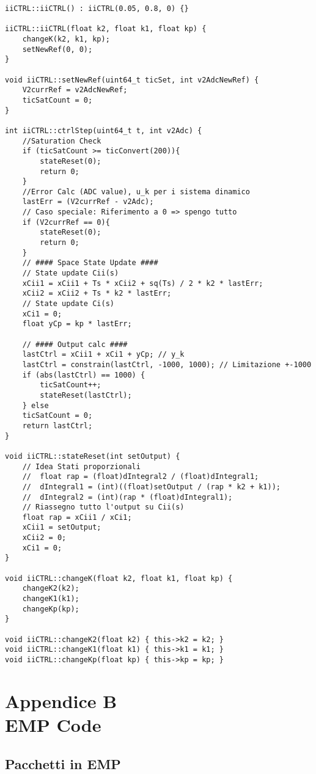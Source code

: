\begin{lstlisting}[style=cppStyle,caption={Source Classe controllore C(s)},label=lst:controlClassCpp] 
iiCTRL::iiCTRL() : iiCTRL(0.05, 0.8, 0) {}

iiCTRL::iiCTRL(float k2, float k1, float kp) {
	changeK(k2, k1, kp);
	setNewRef(0, 0);
}

void iiCTRL::setNewRef(uint64_t ticSet, int v2AdcNewRef) {
	V2currRef = v2AdcNewRef;
	ticSatCount = 0;
}

int iiCTRL::ctrlStep(uint64_t t, int v2Adc) {
	//Saturation Check
	if (ticSatCount >= ticConvert(200)){
		stateReset(0);
		return 0;
	}
	//Error Calc (ADC value), u_k per i sistema dinamico
	lastErr = (V2currRef - v2Adc);
	// Caso speciale: Riferimento a 0 => spengo tutto
	if (V2currRef == 0){
		stateReset(0);
		return 0;
	}
	// #### Space State Update ####
	// State update Cii(s)
	xCii1 = xCii1 + Ts * xCii2 + sq(Ts) / 2 * k2 * lastErr;
	xCii2 = xCii2 + Ts * k2 * lastErr;
	// State update Ci(s)
	xCi1 = 0;
	float yCp = kp * lastErr;
	
	// #### Output calc ####
	lastCtrl = xCii1 + xCi1 + yCp; // y_k
	lastCtrl = constrain(lastCtrl, -1000, 1000); // Limitazione +-1000
	if (abs(lastCtrl) == 1000) {
		ticSatCount++;
		stateReset(lastCtrl);
	} else
	ticSatCount = 0;
	return lastCtrl;
}

void iiCTRL::stateReset(int setOutput) {
	// Idea Stati proporzionali
	//  float rap = (float)dIntegral2 / (float)dIntegral1;
	//  dIntegral1 = (int)((float)setOutput / (rap * k2 + k1));
	//  dIntegral2 = (int)(rap * (float)dIntegral1);
	// Riassegno tutto l'output su Cii(s)
	float rap = xCii1 / xCi1;
	xCii1 = setOutput;
	xCii2 = 0;
	xCi1 = 0;
}

void iiCTRL::changeK(float k2, float k1, float kp) {
	changeK2(k2);
	changeK1(k1);
	changeKp(kp);
}

void iiCTRL::changeK2(float k2) { this->k2 = k2; }
void iiCTRL::changeK1(float k1) { this->k1 = k1; }
void iiCTRL::changeKp(float kp) { this->kp = kp; }
\end{lstlisting}



\chapter*{Appendice B\\ EMP Code} \label{EMPCode}
\setcounter{chapter}{\thechapter + 1}

\section{Pacchetti in EMP}
